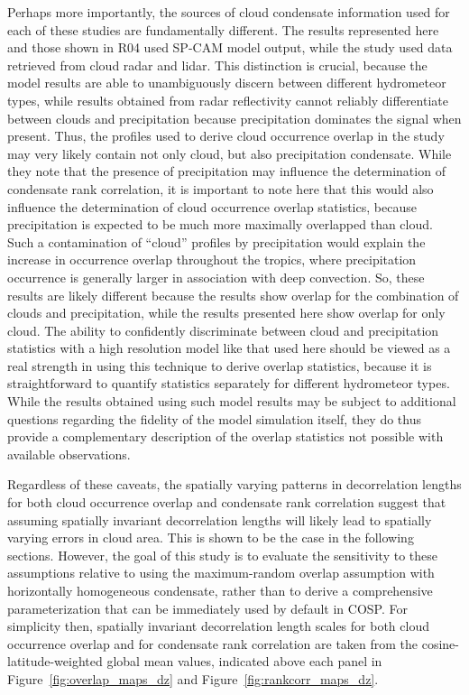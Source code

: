 Perhaps more importantly, the sources of cloud condensate information
used for each of these studies are fundamentally different. The results
represented here and those shown in R04 used SP-CAM model output, while
the \citet{oreopoulos_et_al_2012} study used data retrieved from cloud
radar and lidar. This distinction is crucial, because the model results
are able to unambiguously discern between different hydrometeor types,
while results obtained from radar reflectivity cannot reliably
differentiate between clouds and precipitation because precipitation
dominates the signal when present. Thus, the profiles used to derive
cloud occurrence overlap in the \citet{oreopoulos_et_al_2012} study may
very likely contain not only cloud, but also precipitation condensate.
While they note that the presence of precipitation may influence the
determination of condensate rank correlation, it is important to note
here that this would also influence the determination of cloud
occurrence overlap statistics, because precipitation is expected to be
much more maximally overlapped than cloud. Such a contamination of
``cloud'' profiles by precipitation would explain the increase in
occurrence overlap throughout the tropics, where precipitation
occurrence is generally larger in association with deep convection. So,
these results are likely different because the
\citet{oreopoulos_et_al_2012} results show overlap for the combination
of clouds and precipitation, while the results presented here show
overlap for only cloud. The ability to confidently discriminate between
cloud and precipitation statistics with a high resolution model like
that used here should be viewed as a real strength in using this
technique to derive overlap statistics, because it is straightforward to
quantify statistics separately for different hydrometeor types. While
the results obtained using such model results may be subject to
additional questions regarding the fidelity of the model simulation
itself, they do thus provide a complementary description of the overlap
statistics not possible with available observations.

Regardless of these caveats, the spatially varying patterns in
decorrelation lengths for both cloud occurrence overlap and condensate
rank correlation suggest that assuming spatially invariant decorrelation
lengths will likely lead to spatially varying errors in cloud area. This
is shown to be the case in the following sections. However, the goal of
this study is to evaluate the sensitivity to these assumptions relative
to using the maximum-random overlap assumption with horizontally
homogeneous condensate, rather than to derive a comprehensive
parameterization that can be immediately used by default in COSP. For
simplicity then, spatially invariant decorrelation length scales for
both cloud occurrence overlap and for condensate rank correlation are
taken from the cosine-latitude-weighted global mean values, indicated
above each panel in Figure~\ref{fig:overlap_maps_dz} and
Figure~\ref{fig:rankcorr_maps_dz}.

